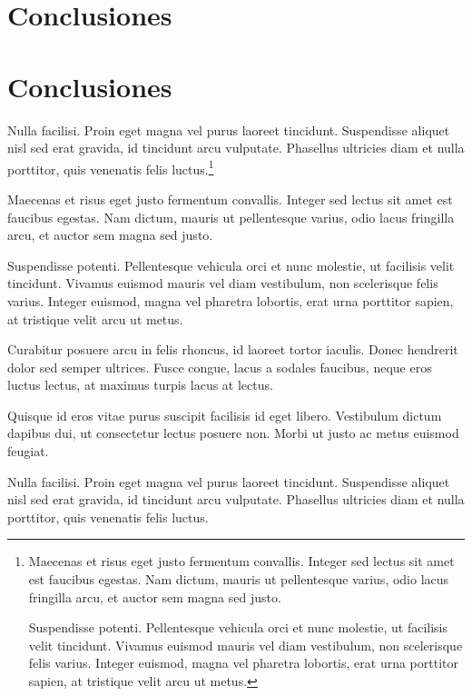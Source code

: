 \ifPDF
\chapter[\hspace{1.5pc}Conclusiones]{Conclusiones}
\setcounter{PrimPag}{\theCurrentPage}
\setcounter{footnote}{0}
	\else
	\ifHTMLEPUB
	\chapter{Conclusiones}
	\fi
\fi

Nulla facilisi. Proin eget magna vel purus laoreet tincidunt. Suspendisse aliquet nisl sed erat gravida, id tincidunt arcu vulputate. Phasellus ultricies diam et nulla porttitor, quis venenatis felis luctus.\footnote{Maecenas et risus eget justo fermentum convallis. Integer sed lectus sit amet est faucibus egestas. Nam dictum, mauris ut pellentesque varius, odio lacus fringilla arcu, et auctor sem magna sed justo.

	Suspendisse potenti. Pellentesque vehicula orci et nunc molestie, ut facilisis velit tincidunt. Vivamus euismod mauris vel diam vestibulum, non scelerisque felis varius. Integer euismod, magna vel pharetra lobortis, erat urna porttitor sapien, at tristique velit arcu ut metus.}

Maecenas et risus eget justo fermentum convallis. Integer sed lectus sit amet est faucibus egestas. Nam dictum, mauris ut pellentesque varius, odio lacus fringilla arcu, et auctor sem magna sed justo.

Suspendisse potenti. Pellentesque vehicula orci et nunc molestie, ut facilisis velit tincidunt. Vivamus euismod mauris vel diam vestibulum, non scelerisque felis varius. Integer euismod, magna vel pharetra lobortis, erat urna porttitor sapien, at tristique velit arcu ut metus.

Curabitur posuere arcu in felis rhoncus, id laoreet tortor iaculis. Donec hendrerit dolor sed semper ultrices. Fusce congue, lacus a sodales faucibus, neque eros luctus lectus, at maximus turpis lacus at lectus.

Quisque id eros vitae purus suscipit facilisis id eget libero. Vestibulum dictum dapibus dui, ut consectetur lectus posuere non. Morbi ut justo ac metus euismod feugiat.

Nulla facilisi. Proin eget magna vel purus laoreet tincidunt. Suspendisse aliquet nisl sed erat gravida, id tincidunt arcu vulputate. Phasellus ultricies diam et nulla porttitor, quis venenatis felis luctus.

